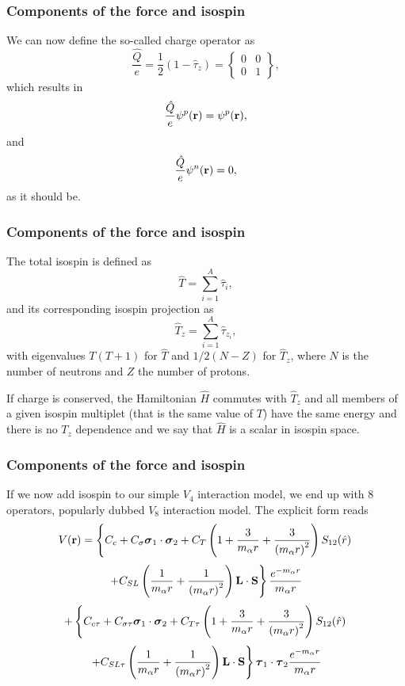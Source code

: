 \documentclass[compress]{beamer}
\begin{document}
\frame
{
\frametitle{Components of the force and isospin}
\begin{small}
{\scriptsize
We can now define the so-called charge operator as 
\[
\frac{\hat{Q}}{e} = \frac{1}{2}\left(1-\hat{\tau}_z\right)=\begin{Bmatrix} 0 & 0 \\ 0 & 1 \end{Bmatrix},
\]
which results in 
\[
\frac{\hat{Q}}{e}\psi^p({\bf r})=\psi^p({\bf r}),
\]
and 
\[
\frac{\hat{Q}}{e}\psi^n({\bf r})=0,
\]
as it should be. 
}
\end{small}
}
\frame
{
\frametitle{Components of the force and isospin}
\begin{small}
{\scriptsize
The total isospin is defined as
\[
\hat{T}=\sum_{i=1}^A\hat{\tau}_i,
\]
and its corresponding isospin projection as
\[
\hat{T}_z=\sum_{i=1}^A\hat{\tau}_{z_i},
\]
with eigenvalues $T(T+1)$ for $\hat{T}$ and $1/2(N-Z)$ for $\hat{T}_z$, where $N$ is the number of neutrons and $Z$ the number of protons. 

If charge is conserved, the Hamiltonian $\hat{H}$ commutes with $\hat{T}_z$ and all members of a given isospin multiplet
(that is the same value of $T$) have the same energy and there is no $T_z$ dependence and we say that $\hat{H}$ is a scalar in isospin space.
}
\end{small}
}
\frame
{
\frametitle{Components of the force and isospin}
\begin{small}
{\scriptsize
If we now add isospin to our simple $V_4$ interaction model, we end up with $8$ operators, popularly dubbed $V_8$ interaction model. The explicit form reads
\[
V({\bf r})= \left\{ C_c + C_\sigma 
\mbox{\boldmath $\sigma$}_1\cdot\mbox{\boldmath $\sigma$}_2
 + C_T \left( 1 + {3\over m_\alpha r} + {3\over
\left(m_\alpha r\right)^2}\right) S_{12} (\hat r)\right. 
\]
\[
\left. + C_{SL} \left( {1\over m_\alpha r} + {1\over \left( m_\alpha r\right)^2}
\right) {\bf L}\cdot {\bf S}
\right\} \frac{e^{-m_\alpha r}}{m_\alpha r}
\]
\[
+ \left\{ C_{c\tau} + C_{\sigma\tau} 
\mbox{\boldmath $\sigma$}_1\cdot\mbox{\boldmath $\sigma$}_2
 + C_{T\tau} \left( 1 + {3\over m_\alpha r} + {3\over
\left(m_\alpha r\right)^2}\right) S_{12} (\hat r)\right. 
\]
\[
\left. + C_{SL\tau} \left( {1\over m_\alpha r} + {1\over \left( m_\alpha r\right)^2}
\right) {\bf L}\cdot {\bf S}
\right\}\mbox{\boldmath $\tau$}_1\cdot\mbox{\boldmath $\tau$}_2 \frac{e^{-m_\alpha r}}{m_\alpha r}
\]
}
\end{small}
}
\frame
\end{document}
